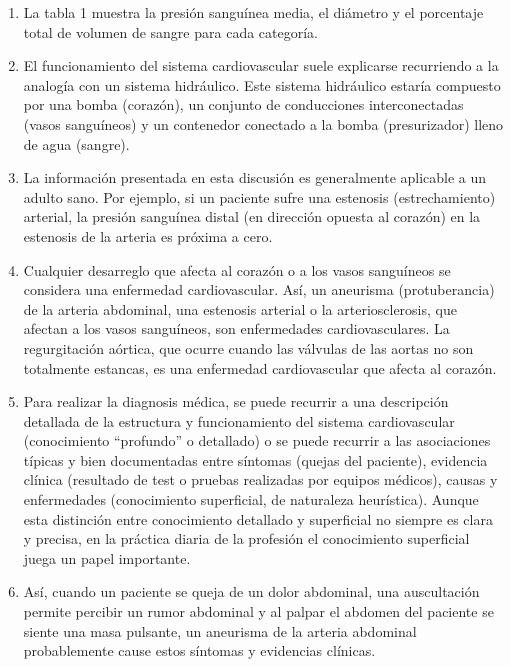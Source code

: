 \documentclass[10pt, a4paper,spanish]{article}
\begin{document}
\begin{enumerate}
			\item La tabla 1 muestra la presión sanguínea media, el diámetro y el porcentaje total de volumen de sangre para cada categoría.

			\item El funcionamiento del sistema cardiovascular suele explicarse recurriendo a la analogía con un sistema hidráulico. Este sistema hidráulico estaría compuesto por una bomba (corazón), un conjunto de conducciones interconectadas (vasos sanguíneos) y un contenedor conectado a la bomba (presurizador) lleno de agua (sangre).

			\item La información presentada en esta discusión es generalmente aplicable a un adulto sano. Por ejemplo, si un paciente sufre una estenosis (estrechamiento) arterial, la presión sanguínea distal (en dirección opuesta al corazón) en la estenosis de la arteria es próxima a cero.

			\item Cualquier desarreglo que afecta al corazón o a los vasos sanguíneos se considera una enfermedad cardiovascular. Así, un aneurisma (protuberancia) de la arteria abdominal, una estenosis arterial o la arteriosclerosis, que afectan a los vasos sanguíneos, son enfermedades cardiovasculares. La regurgitación aórtica, que ocurre cuando las válvulas de las aortas no son totalmente estancas, es una enfermedad cardiovascular que afecta al corazón.

			\item Para realizar la diagnosis médica, se puede recurrir a una descripción detallada de la estructura y funcionamiento del sistema cardiovascular (conocimiento “profundo” o detallado) o se puede recurrir a las asociaciones típicas y bien documentadas entre síntomas (quejas del paciente), evidencia clínica (resultado de test o pruebas realizadas por equipos médicos), causas y enfermedades (conocimiento superficial, de naturaleza heurística). Aunque esta distinción entre conocimiento detallado y superficial no siempre es clara y precisa, en la práctica diaria de la profesión el conocimiento superficial juega un papel importante.

			\item Así, cuando un paciente se queja de un dolor abdominal, una auscultación permite percibir un rumor abdominal y al palpar el abdomen del paciente se siente una masa pulsante, un aneurisma de la arteria abdominal probablemente cause estos síntomas y evidencias clínicas.


\end{enumerate}
\end{document}

